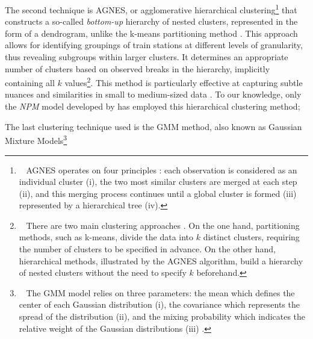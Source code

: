 \begin{refsegment}
\begin{customitemize}
    \item The second technique is \acrfull{AGNES}, or agglomerative hierarchical clustering\footnote{~
        \acrfull{AGNES} operates on four principles \textcolor{blue}{\autocite[5]{barve_reef-insight_2023}}: each observation is considered as an individual cluster (i), the two most similar clusters are merged at each step (ii), and this merging process continues until a global cluster is formed (iii) represented by a hierarchical tree (iv).
    } that constructs a so-called \textsl{bottom-up} hierarchy of nested clusters, represented in the form of a dendrogram, unlike the k-means partitioning method \textcolor{blue}{\autocite[199]{kaufman_finding_1990}}. This approach allows for identifying groupings of train stations at different levels of granularity, thus revealing subgroups within larger clusters. It determines an appropriate number of clusters based on observed breaks in the hierarchy, implicitly containing all \(k\) values\footnote{~
        There are two main clustering approaches \textcolor{blue}{\autocite[2]{struyf_clustering_1997}}. On the one hand, partitioning methods, such as k-means, divide the data into \(k\) distinct clusters, requiring the number of clusters to be specified in advance. On the other hand, hierarchical methods, illustrated by the \acrshort{AGNES} algorithm, build a hierarchy of nested clusters without the need to specify \(k\) beforehand.
    }. This method is particularly effective at capturing subtle nuances and similarities in small to medium-sized data \textcolor{blue}{\autocite[5]{barve_reef-insight_2023}}. To our knowledge, only the \textsl{NPM} model developed by \textcolor{blue}{\textcite[3]{olaru_place_2019}} has employed this hierarchical clustering method;
    \item The last clustering technique used is the \acrfull{GMM} method, also known as Gaussian Mixture Models\footnote{~
        The \acrshort{GMM} model relies on three parameters: the mean which defines the center of each Gaussian distribution (i), the covariance which represents the spread of the distribution (ii), and the mixing probability which indicates the relative weight of the Gaussian distributions (iii) \textcolor{blue}{\autocite[5]{barve_reef-insight_2023}}.
}
\end{customitemize}
\end{refsegment}
